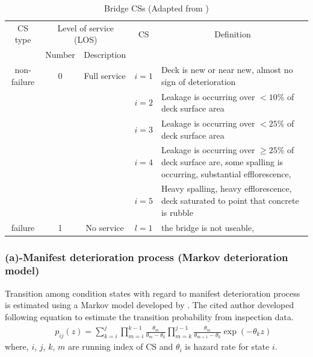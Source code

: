 \documentclass[fleqn]{article}
\begin{document}
\begin{table}[H]
\caption{Bridge CSs (Adapted from \citep{Lethanh2015})}
\begin{center}
\begin{tabular}{p{2cm}|p{1cm}|p{1.5cm}|l|p{6cm}}
\hline
\multicolumn{1}{c|}{CS type} & \multicolumn{2}{c|}{Level of service (LOS)} & \multicolumn{1}{c|}{CS} & \multicolumn{1}{c}{Definition} \\ 
\cline{2-3}
\multicolumn{1}{c|}{} & \multicolumn{1}{c|}{Number} & \multicolumn{1}{c|}{Description} & \multicolumn{1}{c|}{} &  \\ 
\hline
\multicolumn{1}{c|}{non-failure} & \multicolumn{1}{c|}{0} & \multicolumn{1}{c|}{Full service} & \multicolumn{1}{c|}{$i=1$} & Deck is new or near new, almost no sign of deterioration \\ 
\cline{4-5}
\multicolumn{1}{c|}{} & \multicolumn{1}{c|}{} & \multicolumn{1}{c|}{} & \multicolumn{1}{c|}{$i=2$} & Leakage is occurring over $< 10\%$ of deck surface area \\ 
\cline{4-5}
\multicolumn{1}{c|}{} & \multicolumn{1}{c|}{} & \multicolumn{1}{c|}{} & \multicolumn{1}{c|}{$i=3$} & Leakage is occurring over $< 25\%$ of deck surface area \\ 
\cline{4-5}
\multicolumn{1}{c|}{} & \multicolumn{1}{c|}{} & \multicolumn{1}{c|}{} & \multicolumn{1}{c|}{$i=4$} & Leakage is occurring over $\ge 25\%$ of deck surface are, some spalling is occurring, substantial efflorescence, \\ 
\cline{4-5}
\multicolumn{1}{c|}{} & \multicolumn{1}{c|}{} & \multicolumn{1}{c|}{} & \multicolumn{1}{c|}{$i=5$} & Heavy spalling, heavy efflorescence, deck saturated to point that concrete is rubble \\ 
\hline
\multicolumn{1}{c|}{failure} & \multicolumn{1}{c|}{1} & \multicolumn{1}{c|}{No service} & \multicolumn{1}{c|}{$l=1$} & the bridge is not useable, \\ 
\hline
\end{tabular}
\end{center}
\label{statedefinition}
\end{table}
\subsubsection*{(a)-Manifest deterioration process (Markov deterioration model)}
Transition among condition states with regard to manifest deterioration process is estimated using a Markov model developed by \cite{Kobayashi2012}. The cited author developed following equation to estimate the transition probability from inspection data.
\begin{eqnarray}
&& {p_{ij}}(z) = \sum\limits_{k = i}^j  \prod\limits_{m = i}^{k - 1}  \frac{{{\theta _m}}}{{{\theta _m} - {\theta _k}}}\prod\limits_{m = k}^{j - 1}  \frac{{{\theta _m}}}{{{\theta _{m + 1}} - {\theta _k}}}\exp ( - {\theta _k}z)
 \label{mtp}
\end{eqnarray}
where, $i$, $j$, $k$, $m$ are running index of CS and $\theta_i$ is hazard rate for state $i$.
\end{document}
